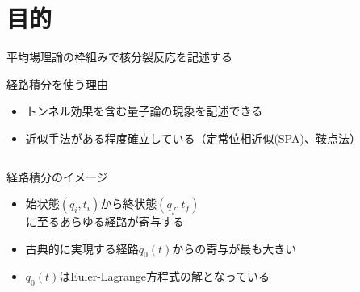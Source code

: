 \documentclass[14pt,aspectratio=169,xcolor=dvipsnames,table,dvipdfmx]{beamer}
\theoremstyle{definition}
\begin{document}
\section{目的}
\begin{frame}{平均場理論の枠組みで核分裂反応を記述する}
  \begin{block}{経路積分を使う理由}
    \begin{itemize}
      \item トンネル効果を含む量子論の現象を記述できる
      \item 近似手法がある程度確立している（定常位相近似(SPA)、鞍点法）
    \end{itemize}
  \end{block}
  \begin{columns}[t]
    \begin{column}{.53\textwidth}
      \vspace{-5mm}
      \begin{exampleblock}{経路積分のイメージ}
        \begin{itemize}
          \item 始状態$(q_i,t_i)$から終状態$(q_f,t_f)$\\に至るあらゆる経路が寄与する
          \item 古典的に実現する経路$q_0(t)$からの寄与が最も大きい
          \item $q_0(t)$はEuler-Lagrange方程式の解となっている
        \end{itemize}
      \end{exampleblock}
    \end{column}
    \begin{column}{.44\textwidth}
    \end{column}
  \end{columns}

\end{frame}
\end{document}
